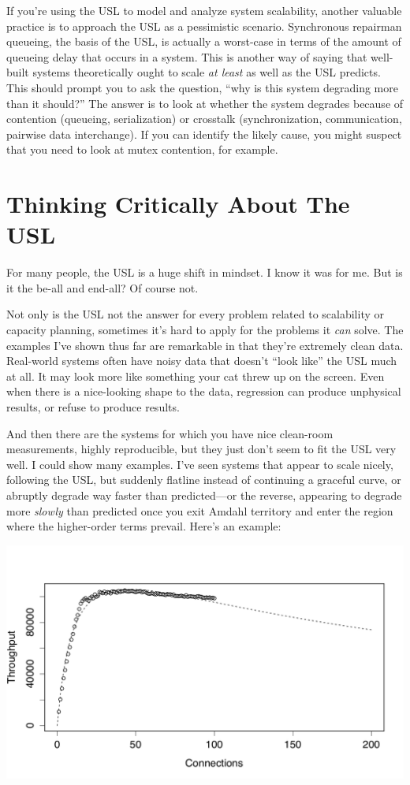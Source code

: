 \documentclass{vivid_layout}
\begin{document}
If you're using the USL to model and analyze system scalability, another
valuable practice is to approach the USL as a pessimistic scenario. Synchronous
repairman queueing, the basis of the USL, is actually a worst-case in terms of
the amount of queueing delay that occurs in a system. This is another way of
saying that well-built systems theoretically ought to scale {\itshape at least}
as well as the USL predicts. This should prompt you to ask the question, ``why
is this system degrading more than it should?'' The answer is to look at
whether the system degrades because of contention (queueing, serialization) or
crosstalk (synchronization, communication, pairwise data interchange). If you
can identify the likely cause, you might suspect that you need to look at mutex
contention, for example.

\newpage
\section{Thinking Critically About The USL}

For many people, the USL is a huge shift in mindset. I know it was for me. But
is it the be-all and end-all? Of course not.

Not only is the USL not the answer for every problem related to scalability
or capacity planning, sometimes it's hard to apply for the problems it
{\itshape can} solve. The examples I've shown thus far are remarkable in that
they're extremely clean data. Real-world systems often have noisy data that
doesn't ``look like'' the USL much at all. It may look more like something your
cat threw up on the screen. Even when there is a nice-looking shape to the data,
regression can produce unphysical results, or refuse to produce results.

And then there are the systems for which you have nice clean-room measurements,
highly reproducible, but they just don't seem to fit the USL very well. I could show
many examples. I've seen systems that appear to scale nicely, following the USL,
but suddenly flatline instead of continuing a graceful curve, or abruptly
degrade way faster than predicted---or the reverse, appearing to degrade more
{\itshape slowly} than predicted once you exit Amdahl territory and enter the
region where the higher-order terms prevail.  Here's an example:
\begin{center}
\includegraphics[width=.85\linewidth]{scalability/handlersocket}
\end{center}
\end{document}

